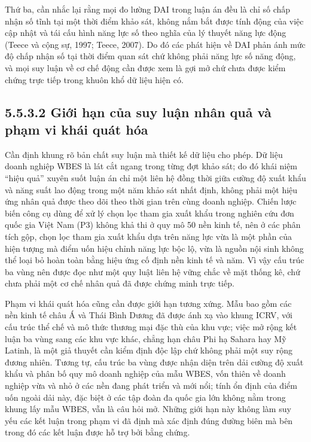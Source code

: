\documentclass[
  a4paper,
  13pt]{extreport}
\begin{document}
Thứ ba, cần nhắc lại rằng mọi đo lường DAI trong luận án đều là chỉ số
chấp nhận số tĩnh tại một thời điểm khảo sát, không nắm bắt được tính
động của việc cập nhật và tái cấu hình năng lực số theo nghĩa của lý
thuyết năng lực động (Teece và cộng sự, 1997; Teece, 2007). Do đó các
phát hiện về DAI phản ánh mức độ chấp nhận số tại thời điểm quan sát chứ
không phải năng lực số năng động, và mọi suy luận về cơ chế động cần
được xem là gợi mở chứ chưa được kiểm chứng trực tiếp trong khuôn khổ dữ
liệu hiện có.

\hypertarget{giux1edbi-hux1ea1n-cux1ee7a-suy-luux1eadn-nhuxe2n-quux1ea3-vuxe0-phux1ea1m-vi-khuxe1i-quuxe1t-huxf3a}{%
\subsection{5.5.3.2 Giới hạn của suy luận nhân quả và phạm vi khái quát
hóa}\label{giux1edbi-hux1ea1n-cux1ee7a-suy-luux1eadn-nhuxe2n-quux1ea3-vuxe0-phux1ea1m-vi-khuxe1i-quuxe1t-huxf3a}}

Cần định khung rõ bản chất suy luận mà thiết kế dữ liệu cho phép. Dữ
liệu doanh nghiệp WBES là lát cắt ngang trong từng đợt khảo sát; do đó
khái niệm ``hiệu quả'' xuyên suốt luận án chỉ một liên hệ đồng thời giữa
cường độ xuất khẩu và năng suất lao động trong một năm khảo sát nhất
định, không phải một hiệu ứng nhân quả được theo dõi theo thời gian trên
cùng doanh nghiệp. Chiến lược biến công cụ dùng để xử lý chọn lọc tham
gia xuất khẩu trong nghiên cứu đơn quốc gia Việt Nam (P3) không khả thi
ở quy mô 50 nền kinh tế, nên ở các phân tích gộp, chọn lọc tham gia xuất
khẩu dựa trên năng lực vừa là một phần của hiện tượng mà điểm uốn hiệu
chỉnh năng lực bộc lộ, vừa là nguồn nội sinh không thể loại bỏ hoàn toàn
bằng hiệu ứng cố định nền kinh tế và năm. Vì vậy cấu trúc ba vùng nên
được đọc như một quy luật liên hệ vững chắc về mặt thống kê, chứ chưa
phải một cơ chế nhân quả đã được chứng minh trực tiếp.

Phạm vi khái quát hóa cũng cần được giới hạn tương xứng. Mẫu bao gồm các
nền kinh tế châu Á và Thái Bình Dương đã được ánh xạ vào khung ICRV, với
cấu trúc thể chế và mô thức thương mại đặc thù của khu vực; việc mở rộng
kết luận ba vùng sang các khu vực khác, chẳng hạn châu Phi hạ Sahara hay
Mỹ Latinh, là một giả thuyết cần kiểm định độc lập chứ không phải một
suy rộng đương nhiên. Tương tự, cấu trúc ba vùng được nhận diện trên dải
cường độ xuất khẩu và phân bố quy mô doanh nghiệp của mẫu WBES, vốn
thiên về doanh nghiệp vừa và nhỏ ở các nền đang phát triển và mới nổi;
tính ổn định của điểm uốn ngoài dải này, đặc biệt ở các tập đoàn đa quốc
gia lớn không nằm trong khung lấy mẫu WBES, vẫn là câu hỏi mở. Những
giới hạn này không làm suy yếu các kết luận trong phạm vi đã định mà xác
định đúng đường biên mà bên trong đó các kết luận được hỗ trợ bởi bằng
chứng.
\end{document}
